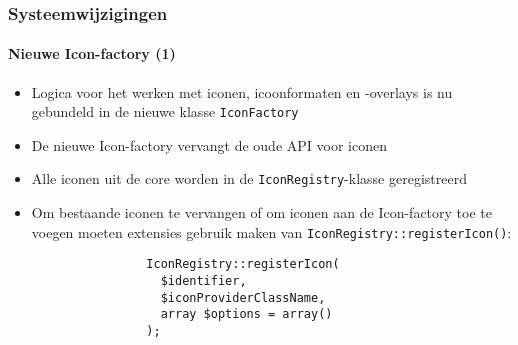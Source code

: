 \begin{frame}[fragile]
	\frametitle{Systeemwijzigingen}
	\framesubtitle{Nieuwe Icon-factory (1)}

	\lstset{basicstyle=\smaller\ttfamily}

	\begin{itemize}

		\item Logica voor het werken met iconen, icoonformaten en -overlays
			is nu gebundeld in de nieuwe klasse \texttt{IconFactory}

		\item De nieuwe Icon-factory vervangt de oude API voor iconen

		\item Alle iconen uit de core worden in de \texttt{IconRegistry}-klasse geregistreerd

		\item Om bestaande iconen te vervangen of om iconen aan de Icon-factory toe te voegen 
			moeten extensies gebruik maken van \texttt{IconRegistry::registerIcon()}:

			\begin{lstlisting}
				IconRegistry::registerIcon(
				  $identifier,
				  $iconProviderClassName,
				  array $options = array()
				);
			\end{lstlisting}

	\end{itemize}

\end{frame}


